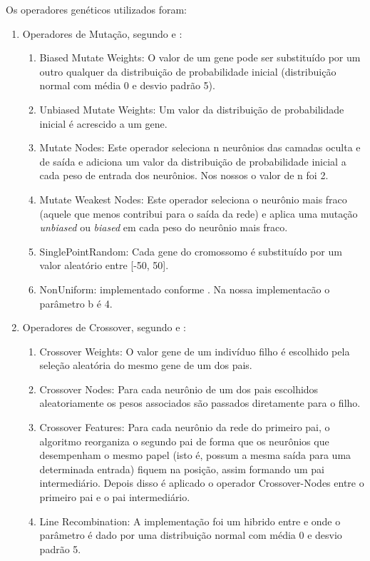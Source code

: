 \documentclass[12pt]{article}
\begin{document}
\par Os operadores genéticos utilizados foram:
\begin{enumerate}
	\item Operadores de Mutação, segundo \cite{montana} e \cite{Liu}:
	\begin{enumerate}
		\item Biased Mutate Weights: O valor de um gene pode ser substituído por um outro qualquer da distribuição de probabilidade inicial (distribuição normal com média 0 e desvio padrão 5).
		\item Unbiased Mutate Weights: Um valor da distribuição de probabilidade inicial é acrescido a um gene.
		\item Mutate Nodes: Este operador seleciona n neurônios das camadas oculta e de saída e adiciona um valor da distribuição de probabilidade inicial a cada peso de entrada dos neurônios. Nos nossos o valor de n foi 2.
		\item Mutate Weakest Nodes: Este operador seleciona o neurônio mais fraco (aquele que menos contribui para o saída da rede) e aplica uma mutação \textit{unbiased} ou \textit{biased} em cada peso do neurônio mais fraco.
		\item SinglePointRandom: Cada gene do cromossomo é substituído por um valor aleatório entre [-50, 50].
		\item NonUniform: implementado conforme \cite{Michalewicz}. Na nossa implementacão o parâmetro b é 4.
		
	\end{enumerate}

	\item Operadores de Crossover, segundo \cite{montana} e \cite{Liu}:
	\begin{enumerate}
		\item Crossover Weights: O valor gene de um indivíduo filho é escolhido pela seleção aleatória do mesmo gene de um dos pais.
		\item Crossover Nodes: Para cada neurônio de um dos pais escolhidos aleatoriamente os pesos associados são passados diretamente para o filho.
		\item Crossover Features: Para cada neurônio da rede do primeiro pai, o algoritmo reorganiza o segundo pai de forma que os neurônios que desempenham o mesmo papel (isto é, possum a mesma saída para uma determinada entrada) fiquem na posição, assim formando um pai intermediário. Depois disso é aplicado o operador Crossover-Nodes entre o primeiro pai e o pai intermediário.
		\item Line Recombination: A implementação foi um hibrido entre \cite{Liu} e \cite{essentials} onde o parâmetro é dado por uma distribuição normal com média 0 e desvio padrão 5.
	\end{enumerate}

\end{enumerate}
\end{document}
